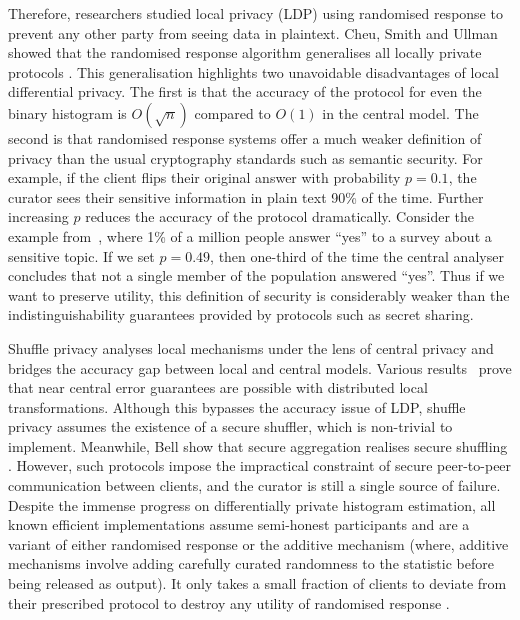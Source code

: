 Therefore, researchers studied local privacy (LDP)  \cite{kasiviswanathan2011can} using randomised response \cite{warner1965randomized} to prevent any other party from seeing data in plaintext. 
Cheu, Smith and Ullman showed that the randomised response algorithm generalises all locally private protocols \cite{cheu2021manipulation}. 
This generalisation highlights two unavoidable disadvantages of local differential privacy. 
The first is that the accuracy of the protocol for even the binary histogram is $O(\sqrt{n})$ compared to $O(1)$ in the central model. 
The second is that randomised response systems offer a much weaker definition of privacy than the usual cryptography standards such as semantic security. 
For example, if the client flips their original answer with probability $p=0.1$, the curator sees their sensitive information in plain text 90\% of the time. 
Further increasing $p$ reduces the accuracy of the protocol dramatically. 
Consider the example from~\cite{corrigan-gibbs_prio_2017}, where 1\% of a million people answer ``yes'' to a survey about a sensitive topic. 
If we set $p=0.49$, then one-third of the time the central analyser concludes that not a single  member of the population answered ``yes''. 
Thus if we want to preserve utility, this definition of security is considerably weaker than the indistinguishability guarantees provided by protocols such as secret sharing.

Shuffle privacy \cite{cheu2021differential, balle2019privacy, erlingsson_amplification_2020} analyses local mechanisms under the lens of central privacy and bridges the accuracy gap between local and central models. 
Various results~\cite{ghazi_power_2020, balcer_separating_2020} prove that near central error guarantees are possible with distributed local transformations. Although this bypasses the accuracy issue of LDP, shuffle privacy assumes the existence of a secure shuffler, which is non-trivial to implement. 
Meanwhile, Bell \etal show that secure aggregation realises secure shuffling \cite{bell2020secure}. 
However, such protocols impose the impractical constraint of secure peer-to-peer communication between clients, and the curator is still a single source of failure. 
Despite the immense progress on differentially private histogram estimation, all known efficient implementations assume semi-honest participants and are a variant of either randomised response or the additive mechanism (where,  
additive mechanisms involve adding carefully curated randomness to the statistic before being released as output). 
It only takes a small fraction of clients to deviate from their prescribed protocol to destroy any utility of randomised response \cite{cheu2021manipulation}. 

